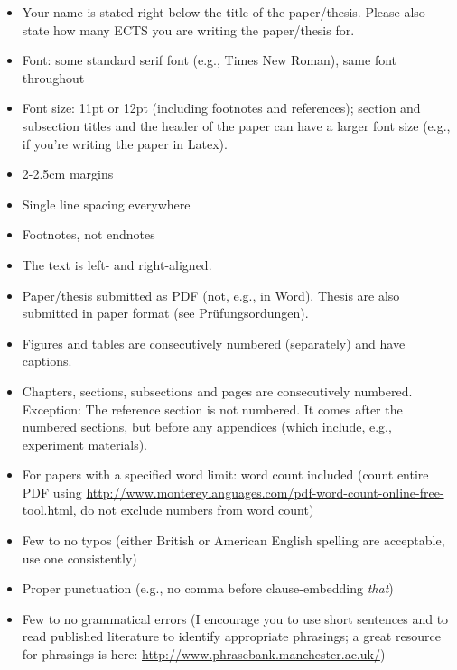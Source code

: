 \documentclass[11pt,fleqn,a4paper/thesis]{article}
\newcommand{\6}{\mbox{$[\hspace*{-.6mm}[$}}
\newcommand{\9}{\mbox{$]\hspace*{-.6mm}]$}}
\begin{document}
\begin{itemize}[itemsep=-1pt,leftmargin=2.5ex,topsep=-2pt]

\item Your name is stated right below the title of the paper/thesis. Please also state how many ECTS you are writing the paper/thesis for.

\item Font: some standard serif font (e.g., Times New Roman), same font throughout

\item Font size: 11pt or 12pt (including footnotes and references); section and subsection titles and the header of the paper can have a larger font size (e.g., if you're writing the paper in Latex).

\item 2-2.5cm margins 

\item Single line spacing everywhere

\item Footnotes, not endnotes

\item The text is left- and right-aligned.

\item Paper/thesis submitted as PDF (not, e.g., in Word). Thesis are also submitted in paper format (see Pr\"ufungsordungen).

\item Figures and tables are consecutively numbered (separately) and have captions.

\item Chapters, sections, subsections and pages are consecutively numbered. Exception: The reference section is not numbered. It comes after the numbered sections, but before any appendices (which include, e.g., experiment materials).

\item For papers with a specified word limit: word count included (count entire PDF using \url{http://www.montereylanguages.com/pdf-word-count-online-free-tool.html}, do not exclude numbers from word count)

\item Few to no typos (either British or American English spelling are acceptable, use one consistently)

\item Proper punctuation (e.g., no comma before clause-embedding {\em that})

\item Few to no grammatical errors (I encourage you to use short sentences and to read published literature to identify appropriate phrasings; a great resource for phrasings is here: \url{http://www.phrasebank.manchester.ac.uk/})


\end{itemize}
\end{document}
